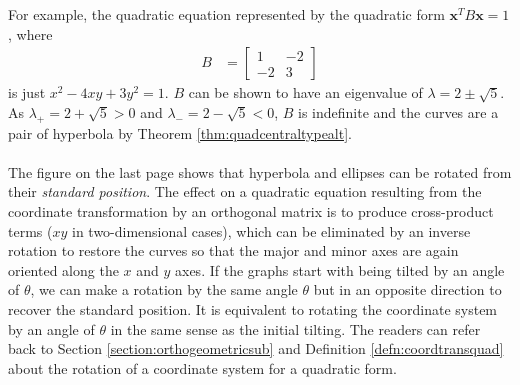 For example, the quadratic equation represented by the quadratic form $\textbf{x}^TB\textbf{x} = 1$, where
\begin{align*}
B &=
\begin{bmatrix}
1 & -2 \\
-2 & 3
\end{bmatrix}
\end{align*}
is just $x^2 - 4xy + 3y^2 = 1$. $B$ can be shown to have an eigenvalue of $\lambda = 2 \pm \sqrt{5}$. As $\lambda_+ = 2 + \sqrt{5} > 0$ and $\lambda_- = 2 - \sqrt{5} < 0$, $B$ is indefinite and the curves are a pair of hyperbola by Theorem \ref{thm:quadcentraltypealt}.\\
\\
The figure on the last page shows that hyperbola and ellipses can be rotated from their \textit{standard position}. The effect on a quadratic equation resulting from the coordinate transformation by an orthogonal matrix is to produce cross-product terms ($xy$ in two-dimensional cases), which can be eliminated by an inverse rotation to restore the curves so that the major and minor axes are again oriented along the $x$ and $y$ axes. If the graphs start with being tilted by an angle of $\theta$, we can make a rotation by the same angle $\theta$ but in an opposite direction to recover the standard position. It is equivalent to rotating the coordinate system by an angle of $\theta$ in the same sense as the initial tilting. The readers can refer back to Section \ref{section:orthogeometricsub} and Definition \ref{defn:coordtransquad} about the rotation of a coordinate system for a quadratic form.

